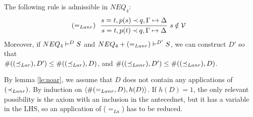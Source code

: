 %
\begin{LEMMA}\label{le:noLanr}
The following rule is admissible in $NEQ_4$:
\[ \eLanr\ \ \mprule{s=t, p(s)\Incl q,\GSD}{s=t,p(t)\Incl q,\GSD}\ s\not\in\Vars \]
Moreover, if ${NEQ_{4}}\vdash^{{D}}S$ and ${NEQ_{4}+(=_{Lanr})}\vdash^{{D'}}S$, 
we can construct $D'$ so that \\ $\#((\preceq_{Lar}),D')\leq\#((\preceq_{Lar}),D)$, and 
$\#((\preceq_{Lanr}),D')\leq\#((\preceq_{Lanr}),D)$.
\end{LEMMA}
\begin{PROOF}
By lemma %
\ref{le:noar}, we assume that $D$ does not contain
any applications of $(\mathbin{\prec}_{Lanr})$. %
By induction on $\langle\#(=_{Lanr},D),h(D)\rangle$. 
If $h(D)=1$, the only relevant possibility is the axiom with an inclusion in the
antecednet, but it has a variable in the LHS, %
so an application of ($=_{La}$) %
has to be reduced.


\end{PROOF}
